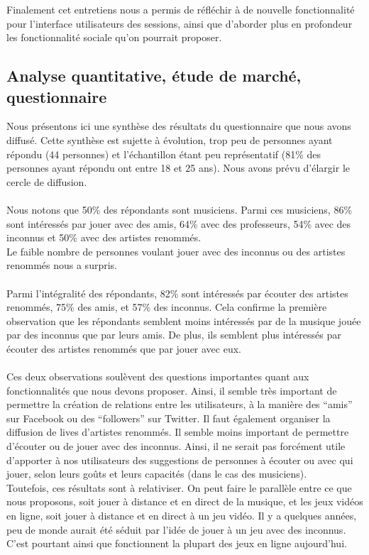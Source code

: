 \documentclass[a4,12pt]{article}
\begin{document}
Finalement cet entretiens nous a permis de réfléchir à de nouvelle fonctionnalité pour l’interface utilisateurs des sessions, ainsi que d’aborder plus en profondeur les fonctionnalité sociale qu’on pourrait proposer.

\subsection{Analyse quantitative, étude de marché, questionnaire}
Nous présentons ici une synthèse des résultats du questionnaire que nous avons diffusé. Cette synthèse est sujette à évolution, trop peu de personnes ayant répondu (44 personnes) et l’échantillon étant peu représentatif (81\% des personnes ayant répondu ont entre 18 et 25 ans). Nous avons prévu d’élargir le cercle de diffusion.\\
\\
Nous notons que 50\% des répondants sont musiciens. Parmi ces musiciens, 86\% sont intéressés par jouer avec des amis, 64\% avec des professeurs, 54\% avec des inconnus et 50\% avec des artistes renommés.\\
Le faible nombre de personnes voulant jouer avec des inconnus ou des artistes renommés nous a surpris.\\
\\
Parmi l’intégralité des répondants, 82\% sont intéressés par écouter des artistes renommés, 75\% des amis, et 57\% des inconnus. Cela confirme la première observation que les répondants semblent moins intéressés par de la musique jouée par des inconnus que par leurs amis. De plus, ils semblent plus intéressés par écouter des artistes renommés que par jouer avec eux.\\
\\
Ces deux observations soulèvent des questions importantes quant aux fonctionnalités que nous devons proposer. Ainsi, il semble très important de permettre la création de relations entre les utilisateurs, à la manière des “amis” sur Facebook ou des “followers” sur Twitter. Il faut également organiser la diffusion de lives d’artistes renommés.
Il semble moins important de permettre d’écouter ou de jouer avec des inconnus. Ainsi, il ne serait pas forcément utile d’apporter à nos utilisateurs des suggestions de personnes à écouter ou avec qui jouer, selon leurs goûts et leurs capacités (dans le cas des musiciens).\\
Toutefois, ces résultats sont à relativiser. On peut faire le parallèle entre ce que nous proposons, soit jouer à distance et en direct de la musique, et les jeux vidéos en ligne, soit jouer à distance et en direct à un jeu vidéo. Il y a quelques années, peu de monde aurait été séduit par l’idée de jouer à un jeu avec des inconnus. C’est pourtant ainsi que fonctionnent la plupart des jeux en ligne aujourd’hui.\\
\end{document}
